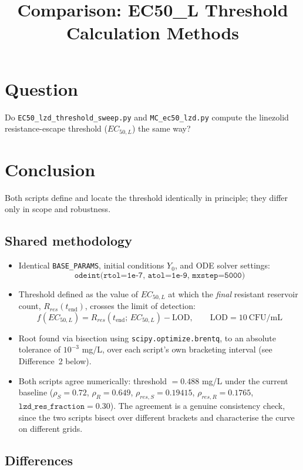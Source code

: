 \documentclass{article}
\title{Comparison: EC50\_L Threshold Calculation Methods}
\author{}
\date{}
\begin{document}
\maketitle

\section*{Question}
Do \texttt{EC50\_lzd\_threshold\_sweep.py} and \texttt{MC\_ec50\_lzd.py} compute the
linezolid resistance-escape threshold ($EC_{50,L}$) the same way?

\section*{Conclusion}
Both scripts define and locate the threshold identically in principle; they differ
only in scope and robustness.

\subsection*{Shared methodology}
\begin{itemize}
  \item Identical \texttt{BASE\_PARAMS}, initial conditions $Y_0$, and ODE solver
        settings:
        \[
          \texttt{odeint(rtol=1e-7,\ atol=1e-9,\ mxstep=5000)}
        \]
  \item Threshold defined as the value of $EC_{50,L}$ at which the
        \emph{final} resistant reservoir count, $R_{res}(t_{\text{end}})$,
        crosses the limit of detection:
        \[
          f(EC_{50,L}) = R_{res}(t_{\text{end}};\,EC_{50,L}) - \mathrm{LOD}, \qquad \mathrm{LOD} = 10\ \text{CFU/mL}
        \]
  \item Root found via bisection using \texttt{scipy.optimize.brentq}, to an
        absolute tolerance of $10^{-3}$ mg/L, over each script's own
        bracketing interval (see Difference~2 below).
  \item Both scripts agree numerically: threshold $= 0.488$ mg/L under the
        current baseline ($\rho_S = 0.72$, $\rho_R = 0.649$,
        $\rho_{res,S} = 0.19415$,
        $\rho_{res,R} = 0.1765$, $\mathtt{lzd\_res\_fraction} = 0.30$).
        The agreement is a genuine consistency check, since the two scripts
        bisect over different brackets and characterise the curve on
        different grids.
\end{itemize}

\subsection*{Differences}
\end{document}
